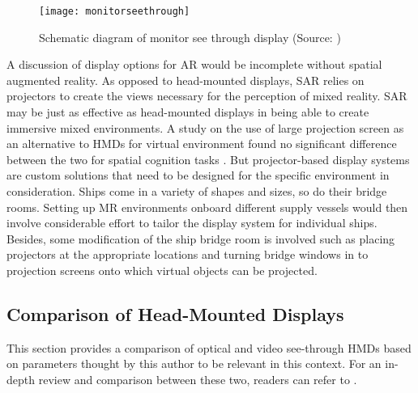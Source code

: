 \begin{figure}
	\centering
	\texttt{[image: monitorseethrough]}
	\caption{Schematic diagram of monitor see through display (Source: \cite{azuma1997survey})}
	\label{fig:monitorseethrough}
\end{figure}

A discussion of display options for AR would be incomplete without spatial augmented reality. As opposed to head-mounted displays, SAR relies on projectors to create the views necessary for the perception of mixed reality. SAR may be just as effective as head-mounted displays in being able to create immersive mixed environments. A study on the use of large projection screen as an alternative to HMDs for virtual environment found no significant difference between the two for spatial cognition tasks \parencite{patrick2000using}. But projector-based display systems are custom solutions that need to be designed for the specific environment in consideration. Ships come in a variety of shapes and sizes, so do their bridge rooms. Setting up MR environments onboard different supply vessels would then involve considerable effort to tailor the display system for individual ships. Besides, some modification of the ship bridge room is involved such as placing projectors at the appropriate locations and turning bridge windows in to projection screens onto which virtual objects can be projected.

\subsection{Comparison of Head-Mounted Displays}
This section provides a comparison of optical and video see-through HMDs based on parameters thought by this author to be relevant in this context. For an in-depth review and comparison between these two, readers can refer to \cite{rolland1995comparison}.

